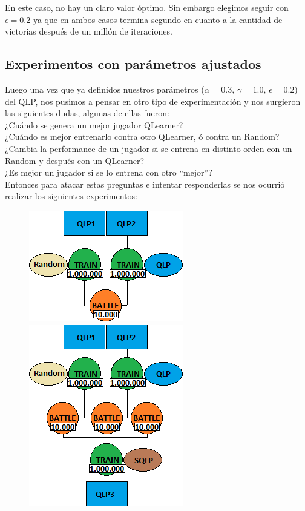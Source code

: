 \documentclass[10pt, a4paper]{article}
\begin{document}
En este caso, no hay un claro valor óptimo. Sin embargo elegimos seguir con $\epsilon=0.2$ ya que en ambos casos termina segundo en cuanto a la cantidad de victorias después de un millón de iteraciones.

\subsection{Experimentos con parámetros ajustados}

Luego una vez que ya definidos nuestros parámetros ($\alpha=0.3$, $\gamma=1.0$, $\epsilon=0.2$) del QLP, nos pusimos a pensar en otro tipo de experimentación y nos surgieron las siguientes dudas, algunas de ellas fueron:\\
¿Cuándo se genera un mejor jugador QLearner? \\
¿Cuándo es mejor entrenarlo contra otro QLearner, ó contra un Random? \\
¿Cambia la performance de un jugador si se entrena en distinto orden con un Random y después con un QLearner?\\
¿Es mejor un jugador si se lo entrena con otro ``mejor''?\\

Entonces para atacar estas preguntas e intentar responderlas se nos ocurrió realizar los siguientes experimentos:

\begin{figure}[H]
  \begin{minipage}[c]{1\textwidth}
    \begin{center}
    \includegraphics[scale=0.5]{E1.png}
    \includegraphics[scale=0.5]{E3.png}
    \end{center}
  \end{minipage}
\end{figure}
\end{document}
